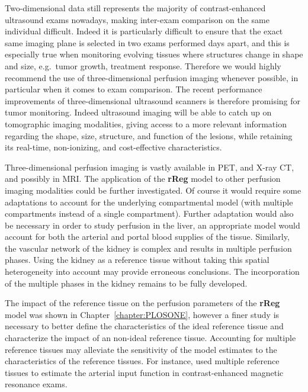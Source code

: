 Two-dimensional data still represents the majority of contrast-enhanced ultrasound exams nowadays, making inter-exam comparison on the same individual difficult.
Indeed it is particularly difficult to ensure that the exact same imaging plane is selected in two exams performed days apart, and this is especially true when monitoring evolving tissues where structures change in shape and size, e.g.~tumor growth, treatment response.
Therefore we would highly recommend the use of three-dimensional perfusion imaging whenever possible, in particular when it comes to exam comparison.
The recent performance improvements of three-dimensional ultrasound scanners is therefore promising for tumor monitoring.
Indeed ultrasound imaging will be able to catch up on tomographic imaging modalities, giving access to a more relevant information regarding the shape, size, structure, and function of the lesions, while retaining its real-time, non-ionizing, and cost-effective characteristics.

Three-dimensional perfusion imaging is vastly available in PET, and X-ray CT, and possibly in MRI.
The application of the \textbf{rReg} model to other perfusion imaging modalities could be further investigated.
Of course it would require some adaptations to account for the underlying compartmental model (with multiple compartments instead of a single compartment).
Further adaptation would also be necessary in order to study perfusion in the liver, an appropriate model would account for both the arterial and portal blood supplies of the tissue.
Similarly, the vascular network of the kidney is complex and results in multiple perfusion phases.
Using the kidney as a reference tissue without taking this spatial heterogeneity into account may provide erroneous conclusions.
The incorporation of the multiple phases in the kidney remains to be fully developed.

The impact of the reference tissue on the perfusion parameters of the \textbf{rReg} model was shown in Chapter~\ref{chapter:PLOSONE}, however a finer study is necessary to better define the characteristics of the ideal reference tissue and characterize the impact of an non-ideal reference tissue. 
Accounting for multiple reference tissues may alleviate the sensitivity of the model estimates to the characteristics of the reference tissues. 
For instance, \citet{Yang:2007ki} used multiple reference tissues to estimate the arterial input function in contrast-enhanced magnetic resonance exams.

